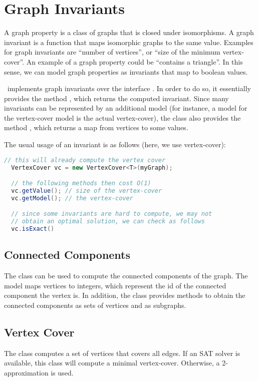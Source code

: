 \documentclass[a4paper, ukenglish, twoside, openright]{jdrasilmanual}
\begin{document}
\chapter{Graph Invariants}
A graph property is a class of graphs that is closed under
isomorphisms. A graph invariant is a function that maps isomorphic
graphs to the same value. Examples for graph invariants are ``number of
vertices'', or ``size of the minimum vertex-cover''. An example of a
graph property could be ``contains a triangle''. In this sense, we can
model graph properties as invariants that map to boolean values.

\Jdrasil\ implements graph invariants over the interface . In order to do so, it
essentially provides the method , which returns the
computed invariant.  Since many invariants can be represented by an
additional model (for instance, a model for the vertex-cover model
is the actual vertex-cover), the class also provides the method
, which returns a map from vertices to some values.

The usual usage of an invariant is as follows (here, we use
vertex-cover):
\begin{lstlisting}[language=Java]
  // this will already compute the vertex cover
  VertexCover vc = new VertexCover<T>(myGraph);

  // the following methods then cost O(1)
  vc.getValue(); // size of the vertex-cover
  vc.getModel(); // the vertex-cover

  // since some invariants are hard to compute, we may not 
  // obtain an optimal solution, we can check as follows
  vc.isExact()
\end{lstlisting}

\section{Connected Components}
The class  can be used to compute the
connected components of the graph. The model maps vertices to
integers, which represent the id of the connected component the vertex
is. In addition, the class provides methods to obtain the connected
components as sets of vertices and as subgraphs.

\section{Vertex Cover}
The class  computes a set of vertices that covers all edges. If an SAT solver is
available, this class will compute a minimal vertex-cover. Otherwise,
a 2-approximation is used.
\end{document}
